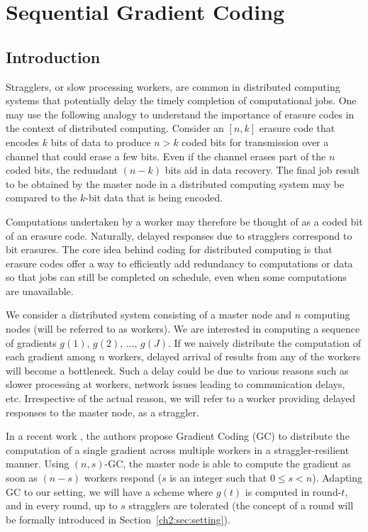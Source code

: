 \chapter{Sequential Gradient Coding}\label{ch:sgc}

\section{Introduction}\label{ch2:sec:intro}

Stragglers, or slow processing workers, are common in distributed computing systems that potentially delay the timely completion of computational jobs.  One may use the following analogy to understand the importance of erasure codes in the context of distributed computing. Consider an $[n,k]$ erasure code that encodes $k$ bits of data to produce $n>k$ coded bits for transmission over a channel that could erase a few bits. Even if the channel erases part of the $n$ coded bits, the redundant $(n-k)$ bits aid in data recovery. The final job result to be obtained by the master node in a distributed computing system may be compared to the $k$-bit data that is being encoded.

Computations undertaken by a worker may therefore be thought of as a coded bit of an erasure code. Naturally, delayed responses due to stragglers correspond to bit erasures. The core idea behind coding for distributed computing is that erasure codes offer a way to efficiently add redundancy to computations or data so that jobs can still be completed on schedule, even when some computations are unavailable.

We consider a distributed system consisting of a master node and $n$ computing nodes (will be referred to as workers). We are interested in computing a sequence of gradients $g(1), \, g(2), \, \ldots, \, g(J)$. If we naively distribute the computation of each gradient among $n$ workers, delayed arrival of results from any of the workers will become a bottleneck. Such a delay could be due to various reasons such as slower processing at workers, network issues leading to communication delays, etc. Irrespective of the actual reason, we will refer to a worker providing delayed responses to the master node, as a straggler. 

In a recent work \cite{grad_coding}, the authors propose Gradient Coding (GC) to distribute the computation of a single gradient across multiple workers in a straggler-resilient manner. Using $(n,s)$-GC, the master node is able to compute the gradient as soon as $(n-s)$ workers respond ($s$ is an integer such that $0\leq s<n$). Adapting GC to our setting, we will have a scheme where $g(t)$ is computed in round-$t$, and in every round, up to $s$ stragglers are tolerated (the concept of a round will be formally introduced in Section~\ref{ch2:sec:setting}).

